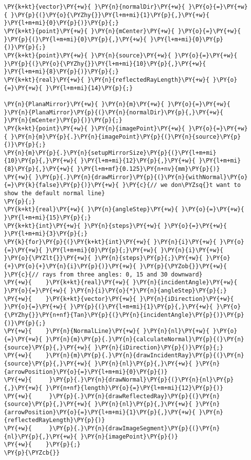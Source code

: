 \begin{Verbatim}[commandchars=\\\{\}]
\PY{k+kt}{vector}\PY{+w}{ }\PY{n}{normalDir}\PY{+w}{ }\PY{o}{=}\PY{+w}{ }\PY{p}{(}\PY{o}{\PYZhy{}}\PY{l+m+mi}{1}\PY{p}{,}\PY{+w}{ }\PY{l+m+mi}{0}\PY{p}{)}\PY{p}{;}
\PY{k+kt}{point}\PY{+w}{ }\PY{n}{mCenter}\PY{+w}{ }\PY{o}{=}\PY{+w}{ }\PY{p}{(}\PY{l+m+mi}{0}\PY{p}{,}\PY{+w}{ }\PY{l+m+mi}{0}\PY{p}{)}\PY{p}{;}
\PY{k+kt}{point}\PY{+w}{ }\PY{n}{source}\PY{+w}{ }\PY{o}{=}\PY{+w}{ }\PY{p}{(}\PY{o}{\PYZhy{}}\PY{l+m+mi}{10}\PY{p}{,}\PY{+w}{ }\PY{l+m+mi}{8}\PY{p}{)}\PY{p}{;}
\PY{k+kt}{real}\PY{+w}{ }\PY{n}{reflectedRayLength}\PY{+w}{ }\PY{o}{=}\PY{+w}{ }\PY{l+m+mi}{14}\PY{p}{;}

\PY{n}{PlanaMirror}\PY{+w}{ }\PY{n}{m}\PY{+w}{ }\PY{o}{=}\PY{+w}{ }\PY{n}{PlanaMirror}\PY{p}{(}\PY{n}{normalDir}\PY{p}{,}\PY{+w}{ }\PY{n}{mCenter}\PY{p}{)}\PY{p}{;}
\PY{k+kt}{point}\PY{+w}{ }\PY{n}{imagePoint}\PY{+w}{ }\PY{o}{=}\PY{+w}{ }\PY{n}{m}\PY{p}{.}\PY{n}{imagePoint}\PY{p}{(}\PY{n}{source}\PY{p}{)}\PY{p}{;}
\PY{n}{m}\PY{p}{.}\PY{n}{setupMirrorSize}\PY{p}{(}\PY{l+m+mi}{10}\PY{p}{,}\PY{+w}{ }\PY{l+m+mi}{12}\PY{p}{,}\PY{+w}{ }\PY{l+m+mi}{8}\PY{p}{,}\PY{+w}{ }\PY{l+m+mf}{0.125}\PY{n+nv}{mm}\PY{p}{)}
\PY{+w}{ }\PY{p}{.}\PY{n}{drawMirror}\PY{p}{(}\PY{n}{withNormal}\PY{o}{=}\PY{k}{false}\PY{p}{)}\PY{+w}{ }\PY{c}{// we don\PYZsq{}t want to show the default normal line}
\PY{p}{;}
\PY{k+kt}{real}\PY{+w}{ }\PY{n}{angleStep}\PY{+w}{ }\PY{o}{=}\PY{+w}{ }\PY{l+m+mi}{15}\PY{p}{;}
\PY{k+kt}{int}\PY{+w}{ }\PY{n}{steps}\PY{+w}{ }\PY{o}{=}\PY{+w}{ }\PY{l+m+mi}{3}\PY{p}{;}
\PY{k}{for}\PY{p}{(}\PY{k+kt}{int}\PY{+w}{ }\PY{n}{i}\PY{+w}{ }\PY{o}{=}\PY{+w}{ }\PY{l+m+mi}{0}\PY{p}{;}\PY{+w}{ }\PY{n}{i}\PY{+w}{ }\PY{o}{\PYZlt{}}\PY{+w}{ }\PY{n}{steps}\PY{p}{;}\PY{+w}{ }\PY{o}{+}\PY{o}{+}\PY{n}{i}\PY{p}{)}\PY{+w}{ }\PY{p}{\PYZob{}}\PY{+w}{ }\PY{c}{// rays from three angles: 0, 15 and 30 downward}
\PY{+w}{    }\PY{k+kt}{real}\PY{+w}{ }\PY{n}{incidentAngle}\PY{+w}{ }\PY{o}{=}\PY{+w}{ }\PY{n}{i}\PY{o}{*}\PY{n}{angleStep}\PY{p}{;}
\PY{+w}{    }\PY{k+kt}{vector}\PY{+w}{ }\PY{n}{iDirection}\PY{+w}{ }\PY{o}{=}\PY{+w}{ }\PY{p}{(}\PY{l+m+mi}{1}\PY{p}{,}\PY{+w}{ }\PY{o}{\PYZhy{}}\PY{n+nf}{Tan}\PY{p}{(}\PY{n}{incidentAngle}\PY{p}{)}\PY{p}{)}\PY{p}{;}
\PY{+w}{    }\PY{n}{NormalLine}\PY{+w}{ }\PY{n}{nl}\PY{+w}{ }\PY{o}{=}\PY{+w}{ }\PY{n}{m}\PY{p}{.}\PY{n}{calculateNormal}\PY{p}{(}\PY{n}{source}\PY{p}{,}\PY{+w}{ }\PY{n}{iDirection}\PY{p}{)}\PY{p}{;}
\PY{+w}{    }\PY{n}{m}\PY{p}{.}\PY{n}{drawIncidentRay}\PY{p}{(}\PY{n}{source}\PY{p}{,}\PY{+w}{ }\PY{n}{nl}\PY{p}{,}\PY{+w}{ }\PY{n}{arrowPosition}\PY{o}{=}\PY{l+m+mi}{0}\PY{p}{)}
\PY{+w}{     }\PY{p}{.}\PY{n}{drawNormal}\PY{p}{(}\PY{n}{nl}\PY{p}{,}\PY{+w}{ }\PY{n+nf}{length}\PY{o}{=}\PY{l+m+mi}{12}\PY{p}{)}
\PY{+w}{     }\PY{p}{.}\PY{n}{drawReflectedRay}\PY{p}{(}\PY{n}{source}\PY{p}{,}\PY{+w}{ }\PY{n}{nl}\PY{p}{,}\PY{+w}{ }\PY{n}{arrowPosition}\PY{o}{=}\PY{l+m+mi}{1}\PY{p}{,}\PY{+w}{ }\PY{n}{reflectedRayLength}\PY{p}{)}
\PY{+w}{     }\PY{p}{.}\PY{n}{drawImageSegment}\PY{p}{(}\PY{n}{nl}\PY{p}{,}\PY{+w}{ }\PY{n}{imagePoint}\PY{p}{)}
\PY{+w}{    }\PY{p}{;}
\PY{p}{\PYZcb{}}


\end{Verbatim}
